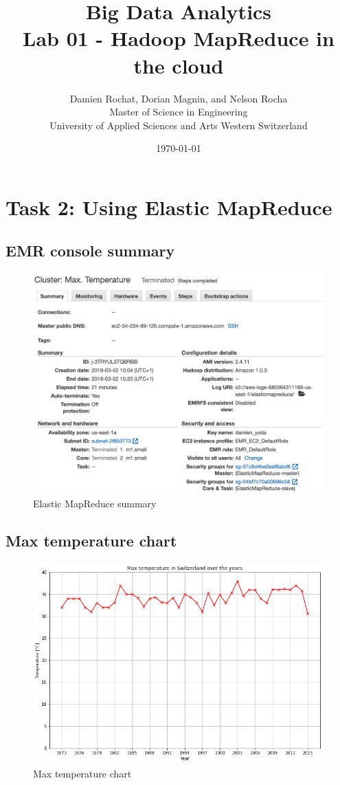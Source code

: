 \documentclass[a4paper]{article}
\title{
	Big Data Analytics \\
	Lab 01 - Hadoop MapReduce in the cloud}
\author{
	Damien Rochat, Dorian Magnin, and Nelson Rocha \\
	Master of Science in Engineering \\
	University of Applied Sciences and Arts Western Switzerland}
\date{\today}
\begin{document}
	\maketitle
	
	\section{Task 2: Using Elastic MapReduce}

	\subsection{EMR console summary}
	\begin{figure}[H]
		\centering
		\includegraphics[width=\columnwidth]{ex02/emr_console.png}
		\caption{Elastic MapReduce summary}
		\label{fig:emr-summary}
	\end{figure}

	\subsection{Max temperature chart}
	\begin{figure}[H]
		\centering
		\includegraphics[width=\columnwidth]{ex02/max_temperature_chart.png}
		\caption{Max temperature chart}
		\label{fig:max-temp-chart}
	\end{figure}
\end{document}
